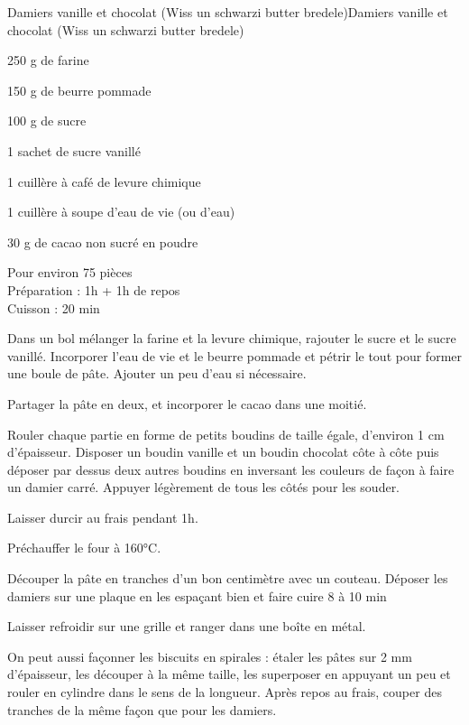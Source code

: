 \begin{recette}{Damiers vanille et chocolat (Wiss un schwarzi butter bredele)}{Damiers vanille et chocolat (Wiss un schwarzi butter bredele)}

\begin{ingredients}
250 g de farine\par
150 g de beurre pommade\par
100 g de sucre\par
1 sachet de sucre vanillé\par
1 cuillère à café de levure chimique\par
1 cuillère à soupe d'eau de vie (ou d'eau)\par
30 g de cacao non sucré en poudre\par
\end{ingredients}

\begin{infos}
Pour environ 75 pièces		\\
Préparation : 1h + 1h de repos	\\
Cuisson : 20 min\\
\end{infos}

\begin{etapes}
\item Dans un bol mélanger la farine et la levure chimique, rajouter le sucre et le sucre vanillé. Incorporer l’eau de vie et le beurre pommade et pétrir le tout pour former une boule de pâte. Ajouter un peu d'eau si nécessaire.
\item Partager la pâte en deux, et incorporer le cacao dans une moitié.
\item Rouler chaque partie en forme de petits boudins de taille égale, d'environ 1 cm d'épaisseur. Disposer un boudin vanille et un boudin chocolat côte à côte puis déposer par dessus deux autres boudins en inversant les couleurs de façon à faire un damier carré. Appuyer légèrement de tous les côtés pour les souder.
\item Laisser durcir au frais pendant 1h.
\item Préchauffer le four à 160°C.
\item Découper la pâte en tranches d'un bon centimètre avec un couteau. Déposer les damiers sur une plaque en les espaçant bien et faire cuire 8 à 10 min
\item Laisser refroidir sur une grille et ranger dans une boîte en métal.
\end{etapes}

\begin{conseils}
On peut aussi façonner les biscuits en spirales : étaler les pâtes sur 2 mm d'épaisseur, les découper à la même taille, les superposer en appuyant un peu et rouler en cylindre dans le sens de la longueur. Après repos au frais, couper des tranches de la même façon que pour les damiers.
\end{conseils}

\end{recette}